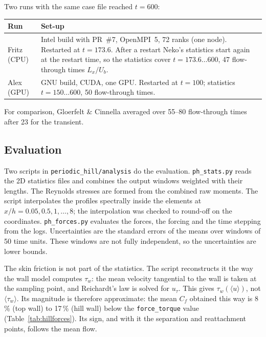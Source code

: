 \documentclass[11pt,a4paper]{article}
\newcommand{\code}[1]{\texttt{#1}}
\begin{document}
\noindent Two runs with the same case file reached $t = 600$:

\begin{center}
\small
\begin{tabularx}{\textwidth}{@{}lX@{}}
\toprule
Run & Set-up \\
\midrule
Fritz (CPU) & Intel build with PR~\#7, OpenMPI~5, 72 ranks (one node).
Restarted at $t = 173.6$. After a restart Neko's statistics start again at
the restart time, so the statistics cover $t = 173.6\ldots600$, 47 flow-through
times $L_x/U_b$. \\
Alex (GPU) & GNU build, CUDA, one GPU. Restarted at $t = 100$; statistics
$t = 150\ldots600$, 50 flow-through times. \\
\bottomrule
\end{tabularx}
\end{center}

\noindent For comparison, Gloerfelt \& Cinnella averaged over 55--80
flow-through times after 23 for the transient.

\subsection{Evaluation}

Two scripts in \code{periodic\_hill/analysis} do the evaluation.
\code{ph\_stats.py} reads the 2D statistics files and combines the output
windows weighted with their lengths. The Reynolds stresses are formed from the
combined raw moments. The script interpolates the profiles spectrally inside
the elements at $x/h = 0.05, 0.5, 1, \ldots, 8$; the interpolation was checked
to round-off on the coordinates. \code{ph\_forces.py} evaluates the forces,
the forcing and the time stepping from the logs. Uncertainties are the
standard errors of the means over windows of 50 time units. These windows
are not fully independent, so the uncertainties are lower bounds.

The skin friction is not part of the statistics. The script reconstructs it
the way the wall model computes $\tau_w$: the mean velocity tangential to the
wall is taken at the sampling point, and Reichardt's law is solved for
$u_\tau$. This gives $\tau_w(\langle u\rangle)$, not
$\langle\tau_w\rangle$. Its magnitude is therefore approximate: the mean
$C_f$ obtained this way is 8\,\% (top wall) to 17\,\% (hill wall) below
the \code{force\_torque} value (Table~\ref{tab:hillforces}). Its sign, and with it the separation and
reattachment points, follows the mean flow.
\end{document}

